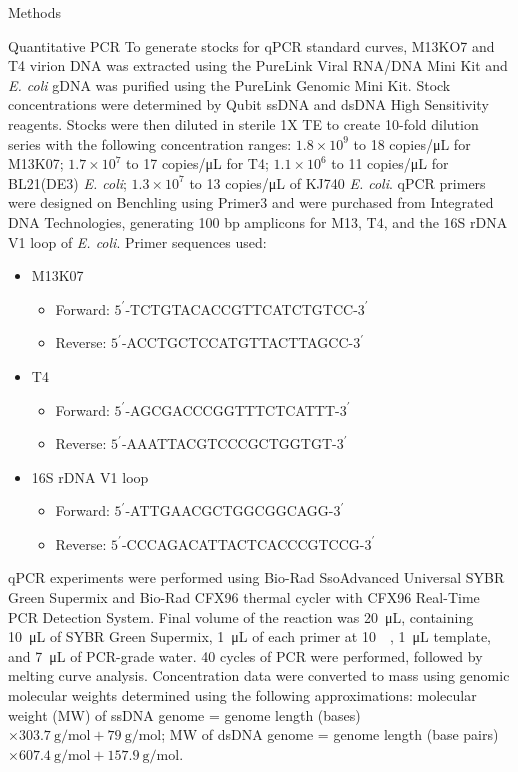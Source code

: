 \documentclass[oneside,12pt,final]{sty/ucthesis-CA2012}
\begin{document}
\begin{mainmatter}
\begin{section}{Methods}
\begin{subsection}{Quantitative PCR}
To generate stocks for qPCR standard curves, M13KO7 and T4 virion DNA was extracted using the PureLink Viral RNA/DNA Mini Kit and \textit{E. coli} gDNA was purified using the PureLink Genomic Mini Kit. Stock concentrations were determined by Qubit ssDNA and dsDNA High Sensitivity reagents. Stocks were then diluted in sterile 1X TE to create 10-fold dilution series with the following concentration ranges: $1.8 \times 10^{9}$ to 18 copies/\si{\micro\liter} for M13K07; $1.7 \times 10^{7}$ to 17 copies/\si{\micro\liter} for T4; $1.1 \times 10^{6}$ to 11 copies/\si{\micro\liter} for BL21(DE3) \textit{E. coli}; $1.3 \times 10^{7}$ to 13 copies/\si{\micro\liter} of KJ740 \textit{E. coli}. qPCR primers were designed on Benchling using Primer3 and were purchased from Integrated DNA Technologies, generating 100 bp amplicons for M13, T4, and the 16S rDNA V1 loop of \textit{E. coli}. Primer sequences used: 
\begin{itemize}
\item M13K07
	\begin{itemize}
		\item Forward: $5^{\prime}$-TCTGTACACCGTTCATCTGTCC-$3^{\prime}$ 
		\item Reverse: $5^{\prime}$-ACCTGCTCCATGTTACTTAGCC-$3^{\prime}$ 
	\end{itemize}
\item T4 
	\begin{itemize}
		\item Forward: $5^{\prime}$-AGCGACCCGGTTTCTCATTT-$3^{\prime}$
		\item Reverse: $5^{\prime}$-AAATTACGTCCCGCTGGTGT-$3^{\prime}$
	\end{itemize}
\item 16S rDNA V1 loop 
	\begin{itemize}
		\item Forward: $5^{\prime}$-ATTGAACGCTGGCGGCAGG-$3^{\prime}$ 
		\item Reverse: $5^{\prime}$-CCCAGACATTACTCACCCGTCCG-$3^{\prime}$
	\end{itemize}
\end{itemize}
qPCR experiments were performed using Bio-Rad SsoAdvanced Universal SYBR Green Supermix and Bio-Rad CFX96 thermal cycler with CFX96 Real-Time PCR Detection System. Final volume of the reaction was \SI{20}{\micro\liter}, containing \SI{10}{\micro\liter} of SYBR Green Supermix, \SI{1}{\micro\liter} of each primer at \SI{10}{\micro\molar}, \SI{1}{\micro\liter} template, and \SI{7}{\micro\liter} of PCR-grade water. 40 cycles of PCR were performed, followed by melting curve analysis. Concentration data were converted to mass using genomic molecular weights determined using the following approximations: molecular weight (MW) of ssDNA genome = genome length (bases) $\times \SI{303.7}{\gram\per\mole} + \SI{79}{\gram\per\mole}$; MW of dsDNA genome = genome length (base pairs) $\times \SI{607.4}{\gram\per\mole} + \SI{157.9}{\gram\per\mole}$.
\end{subsection}


\end{section}
\end{mainmatter}
\end{document}
